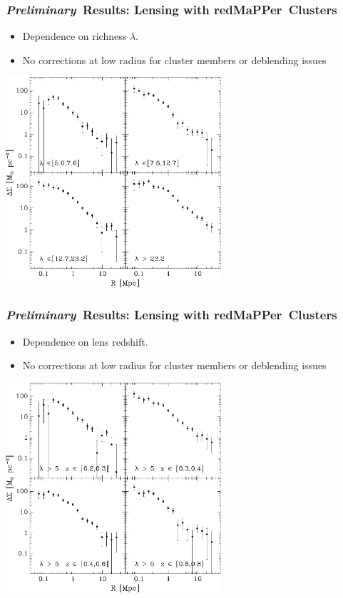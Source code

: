 \documentclass{beamer}
\newcommand{\redmapper}{redMaPPer}
\newcommand{\prelim}{{\bf{\it Preliminary}}}
\begin{document}
\frame
{
    \frametitle{\prelim\ Results: Lensing with \redmapper\ Clusters}

    \begin{itemize}

        \item Dependence on richness $\lambda$.

        \item No corrections at low radius for cluster members or deblending issues

    \end{itemize}


    \begin{center}
        \includegraphics[width=0.6\textwidth]{run-rm008-bin-lbin4-zwide-jack.pdf}
    \end{center}

}

\frame
{
    \frametitle{\prelim\ Results: Lensing with \redmapper\ Clusters}

    \begin{itemize}

        \item Dependence on lens redshift.

        \item No corrections at low radius for cluster members or deblending issues

    \end{itemize}


    \begin{center}
        \includegraphics[width=0.6\textwidth]{run-rm008-bin-lgt05-zbin4-jack.pdf}
    \end{center}

}
\end{document}
